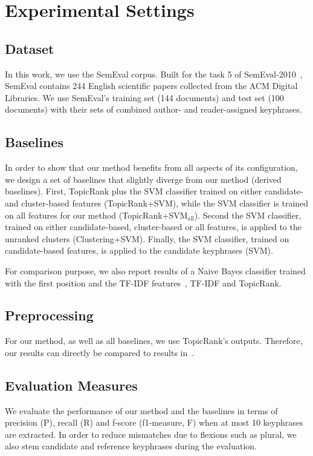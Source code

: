 \section{Experimental Settings}
\label{sec:experimental_settings}
  \subsection{Dataset}
  \label{subsec:dataset}
    In this work, we use the SemEval corpus. Built for the task 5 of
    SemEval-2010~\cite{kim2010semeval}, Sem\-Eval contains 244 English
    scientific papers collected from the ACM Digital Libraries. We use
    Sem\-Eval's training set (144 documents) and test set (100 documents) with
    their sets of combined author- and reader-assigned keyphrases.

  \subsection{Baselines}
  \label{subsec:baselines}
    In order to show that our method benefits from all aspects of its
    configuration, we design a set of baselines that slightly diverge from our
    method (derived baselines). First, To\-picRank plus the SVM classifier
    trained on either candidate- and cluster-based features (TopicRank+SVM),
    while the SVM classifier is trained on all features for our method
    (TopicRank+SVM$_{\text{all}}$). Second the SVM classifier, trained on either
    candidate-based, cluster-based or all features, is applied to the unranked
    clusters (Clustering+SVM). Finally, the SVM classifier, trained on
    candidate-based features, is applied to the candidate keyphrases (SVM).

    For comparison purpose, we also report results of a Naive Bayes classifier
    trained with the first position and the TF-IDF
    features~\cite[KEA]{witten1999kea}, TF-IDF and TopicRank.

  \subsection{Preprocessing}
  \label{subsec:preprocessing}
    For our method, as well as all baselines, we use Topic\-Rank's
    outputs. %
    Therefore, our results can directly be compared to results
    in~\cite{bougouin2013topicrank}.

  \subsection{Evaluation Measures}
  \label{subsec:evaluation_measures}
    We evaluate the performance of our method and the baselines in terms of
    precision (P), recall (R) and f-score (f1-measure, F) when at most 10
    keyphrases are extracted. In order to reduce mismatches due to flexions such
    as plural, we also stem candidate and reference keyphrases during the
    evaluation.


